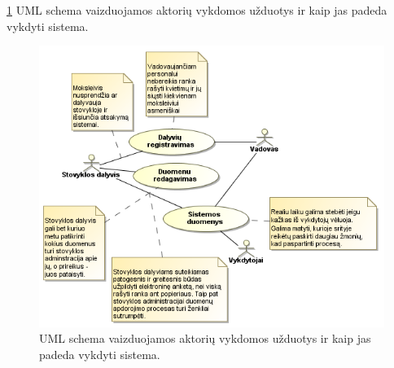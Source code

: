 \ref{fig:uml_tasks2} UML schema vaizduojamos aktorių vykdomos užduotys 
ir kaip jas
padeda vykdyti sistema.

\begin{figure}[htb]
  \begin{center}
    \includegraphics[scale=0.8]{images/sistemos_tiekiama_nauda.png}
  \end{center}
  \caption{UML schema vaizduojamos aktorių vykdomos užduotys ir kaip jas
    padeda vykdyti sistema.}
  \label{fig:uml_tasks2}
\end{figure}

